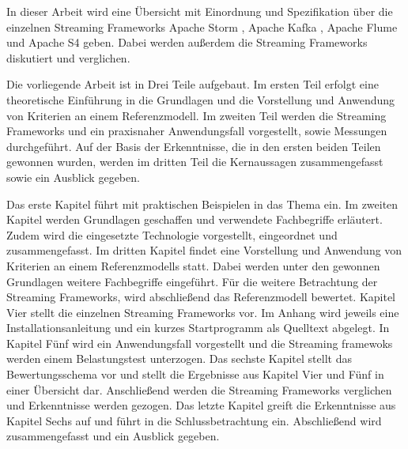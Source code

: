 In dieser Arbeit wird eine Übersicht mit Einordnung und Spezifikation über die einzelnen Streaming Frameworks Apache Storm , Apache Kafka , Apache Flume  und Apache S4  geben. Dabei werden außerdem die Streaming Frameworks diskutiert und verglichen. 


Die vorliegende Arbeit ist in Drei Teile aufgebaut. Im ersten Teil erfolgt eine theoretische Einführung in die Grundlagen und die Vorstellung und Anwendung von Kriterien an einem Referenzmodell. Im zweiten Teil werden die Streaming Frameworks und ein praxisnaher Anwendungsfall vorgestellt, sowie Messungen durchgeführt. 
Auf der Basis der Erkenntnisse, die in den ersten beiden Teilen gewonnen wurden, werden im dritten Teil die Kernaussagen zusammengefasst sowie ein Ausblick gegeben.

Das erste Kapitel führt mit praktischen Beispielen in das Thema ein. Im zweiten Kapitel werden Grundlagen geschaffen und verwendete Fachbegriffe erläutert. Zudem wird die eingesetzte Technologie vorgestellt, eingeordnet und zusammengefasst. 
Im dritten Kapitel findet eine Vorstellung und Anwendung von Kriterien an einem Referenzmodells statt. Dabei werden unter den gewonnen Grundlagen weitere Fachbegriffe eingeführt. Für die weitere Betrachtung der Streaming Frameworks, wird abschließend das Referenzmodell bewertet.
Kapitel Vier stellt die einzelnen Streaming Frameworks vor. Im Anhang wird jeweils eine Installationsanleitung und ein kurzes Startprogramm als Quelltext abgelegt.
In Kapitel Fünf wird ein Anwendungsfall vorgestellt und die Streaming framewoks werden einem Belastungstest unterzogen.
Das sechste Kapitel stellt das Bewertungsschema vor und stellt die Ergebnisse aus Kapitel Vier und Fünf in einer Übersicht dar. Anschließend werden die Streaming Frameworks verglichen und Erkenntnisse werden gezogen.
Das letzte Kapitel greift die Erkenntnisse aus Kapitel Sechs auf und führt in die Schlussbetrachtung ein. Abschließend wird zusammengefasst und ein Ausblick gegeben.